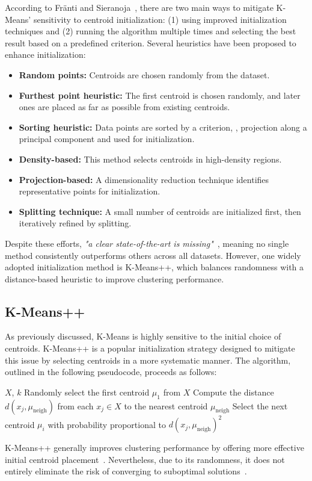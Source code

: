 \documentclass[10pt,twocolumn,letterpaper]{article}
\begin{document}
According to Fränti and Sieranoja~\cite{FRANTI201995}, there are two main ways
to mitigate K-Means’ sensitivity to centroid initialization: (1) using improved
initialization techniques and (2) running the algorithm multiple times and
selecting the best result based on a predefined criterion. Several heuristics
have been proposed to enhance initialization:
\begin{itemize}
    \item \textbf{Random points:} Centroids are chosen randomly from the dataset.
    \item \textbf{Furthest point heuristic:} The first centroid is chosen randomly, and later ones are placed as far as possible from existing centroids.
    \item \textbf{Sorting heuristic:} Data points are sorted by a criterion, \eg, projection along a principal component and used for initialization.
    \item \textbf{Density-based:} This method selects centroids in high-density regions.
    \item \textbf{Projection-based:} A dimensionality reduction technique identifies representative points for initialization.
    \item \textbf{Splitting technique:} A small number of centroids are initialized first, then iteratively refined by splitting.
\end{itemize}
Despite these efforts, \textit{"a clear state-of-the-art is
    missing"}~\cite{FRANTI201995}, meaning no single method consistently
outperforms others across all datasets. However, one widely adopted
initialization method is K-Means++, which balances randomness with a
distance-based heuristic to improve clustering performance.


\subsection{K-Means++}\label{subsec:k-means++}

As previously discussed, K-Means is highly sensitive to the initial choice of
centroids. K-Means++ is a popular initialization strategy designed to mitigate
this issue by selecting centroids in a more systematic manner. The algorithm,
outlined in the following pseudocode, proceeds as follows:
\begin{algorithmic}[1]
    \Require $X$, $k$
    \State Randomly select the first centroid $\mu_1$ from $X$
    \State Compute the distance $d(x_j, \mu_{\text{neigh}})$ from each $x_j\in X$ to the nearest centroid $\mu_{\text{neigh}}$
    \State Select the next centroid $\mu_i$ with probability proportional to $d(x_j, \mu_{\text{neigh}})^2$
    \EndFor
\end{algorithmic}
K-Means++ generally improves clustering performance by offering more effective
initial centroid placement~\cite{FRANTI201995}. Nevertheless, due to its
randomness, it does not entirely eliminate the risk of converging to
suboptimal solutions~\cite{deuschle2019, Abdullah10601123}.
\end{document}
